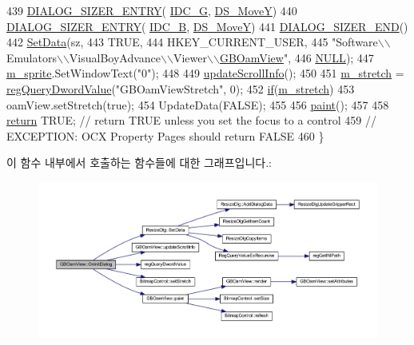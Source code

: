 \begin{DoxyCode}
439     \mbox{\hyperlink{_resize_dlg_8h_a0e9ee7a18c54003893895a009f5d79c8}{DIALOG\_SIZER\_ENTRY}}( \mbox{\hyperlink{resource_8h_a35ca279082796c6a98895939aa06826d}{IDC\_G}}, \mbox{\hyperlink{_resize_dlg_8h_ae5309071be822a4dae5cb33a131f6180}{DS\_MoveY}})
440     \mbox{\hyperlink{_resize_dlg_8h_a0e9ee7a18c54003893895a009f5d79c8}{DIALOG\_SIZER\_ENTRY}}( \mbox{\hyperlink{resource_8h_a96306052e53348b1e760b8dcabf2b0c7}{IDC\_B}}, \mbox{\hyperlink{_resize_dlg_8h_ae5309071be822a4dae5cb33a131f6180}{DS\_MoveY}})    
441     \mbox{\hyperlink{_resize_dlg_8h_aeac0c1e32f30e0763df5736e4b3ea50a}{DIALOG\_SIZER\_END}}()
442     \mbox{\hyperlink{class_resize_dlg_a6a3965f44a0c2f5ba9aaa798a9a81df5}{SetData}}(sz,
443             TRUE,
444             HKEY\_CURRENT\_USER,
445             "Software\(\backslash\)\(\backslash\)Emulators\(\backslash\)\(\backslash\)VisualBoyAdvance\(\backslash\)\(\backslash\)Viewer\(\backslash\)\(\backslash\)\mbox{\hyperlink{class_g_b_oam_view}{GBOamView}}",
446             \mbox{\hyperlink{getopt1_8c_a070d2ce7b6bb7e5c05602aa8c308d0c4}{NULL}});
447   \mbox{\hyperlink{class_g_b_oam_view_a696d053b141cce3bf87fc4b85732159b}{m\_sprite}}.SetWindowText("0");
448 
449   \mbox{\hyperlink{class_g_b_oam_view_a20ce1c6ed837362872920c23e281e523}{updateScrollInfo}}();
450 
451   \mbox{\hyperlink{class_g_b_oam_view_a3148ea0439a7fc0679298adbdb5d2a3e}{m\_stretch}} = \mbox{\hyperlink{_reg_8cpp_a150640889ffff4851ee26d7b999ec7c3}{regQueryDwordValue}}("GBOamViewStretch", 0);
452   \mbox{\hyperlink{arm-new_8h_a93120066fd6daa54150af823953378d1}{if}}(\mbox{\hyperlink{class_g_b_oam_view_a3148ea0439a7fc0679298adbdb5d2a3e}{m\_stretch}})
453     oamView.setStretch(true);
454   UpdateData(FALSE);
455   
456   \mbox{\hyperlink{class_g_b_oam_view_a8ed062f5cac9239a17b0f5942a5d9e5b}{paint}}();
457   
458   \mbox{\hyperlink{gb_codes_8h_a9717e7bbecb906637e86cef6da3d83c2}{return}} TRUE;  \textcolor{comment}{// return TRUE unless you set the focus to a control}
459                 \textcolor{comment}{// EXCEPTION: OCX Property Pages should return FALSE}
460 \}
\end{DoxyCode}
이 함수 내부에서 호출하는 함수들에 대한 그래프입니다.\+:
\nopagebreak
\begin{figure}[H]
\begin{center}
\leavevmode
\includegraphics[width=350pt]{class_g_b_oam_view_a633fdb700275a8a8ce96978472c643b5_cgraph}
\end{center}
\end{figure}
\mbox{\label{class_g_b_oam_view_af5f1f2fd340a83cbf218ef8be53f4089}} 
